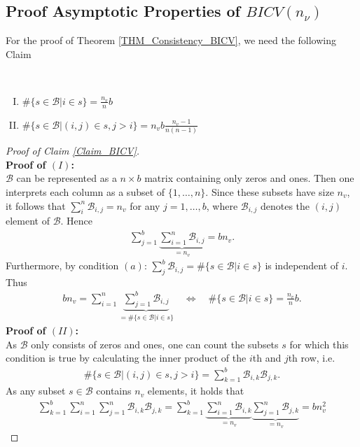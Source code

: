 \documentclass[Research_Module_ES.tex]{subfiles}
\begin{document}
\subsection{Proof Asymptotic Properties of $BICV(n_\nu)$}
For the proof of Theorem \ref{THM_Consistency_BICV}, we need the following Claim
\begin{claim}~
	\label{Claim_BICV}
	\begin{enumerate}[(I)]
		\item $\#\{s\in \mathcal{B}| i\in s\} = \frac{n_v}{n} b$ 
		\item $\#\{s\in\mathcal{B}|(i,j)\in s, j>i\}=n_vb\frac{n_v-1}{n(n-1)}$
	\end{enumerate}
\end{claim}
\begin{proof}[Proof of Claim \ref{Claim_BICV}]~\\
	\textbf{Proof of $(I)$:}\\
	$\mathcal{B}$ can be represented as a $n\times b$ matrix containing only zeros and ones. Then one interprets each column as a subset of $\{ 1,\dots,n\}$. Since these subsets have size $n_v$, it follows that $\sum_i^n \mathcal{B}_{i,j}=n_v$ for any $j= 1, \dots ,b$, where $\mathcal{B}_{i,j}$ denotes the $(i,j)$ element of $\mathcal{B}$. Hence
	\begin{align*}
	\sum_{j=1}^b\underbrace{\sum_{i=1}^n \mathcal{B}_{i,j}}_{=n_v} = bn_v.
	\end{align*}
	Furthermore, by condition $(a)$: $\sum_j^b \mathcal{B}_{i,j} = \#\{s\in \mathcal{B}| i\in s\}$ is independent of $i$. Thus 
	\begin{align*}
	bn_v = \sum_{i=1}^n\underbrace{\sum_{j=1}^b \mathcal{B}_{i,j}}_{=\#\{s\in \mathcal{B}| i\in s\}} \quad
	\iff \quad \#\{s\in \mathcal{B}| i\in s\} = \frac{n_v}{n}b. 
	\end{align*} 
	\textbf{Proof of $(II)$:}\\
	As $\mathcal{B}$ only consists of zeros and ones, one can count the subsets $s$ for which this condition is true by calculating the inner product of the $i$th and $j$th row, i.e.
	\begin{align*}
	\#\{s\in\mathcal{B}|(i,j)\in s, j>i\} = \sum_{k=1}^b\mathcal{B}_{i,k}\mathcal{B}_{j,k}.
	\end{align*}
	As any subset $s \in \mathcal{B}$ contains $n_v$ elements, it holds that
	\begin{align*}
	\sum_{k=1}^b\sum_{i=1}^n\sum_{j=1}^n\mathcal{B}_{i,k}\mathcal{B}_{j,k}= \sum_{k=1}^b\underbrace{\sum_{i=1}^n\mathcal{B}_{i,k}}_{=n_v}\underbrace{\sum_{j=1}^n\mathcal{B}_{j,k}}_{=n_v}=bn_v^2

\end{align*}
\end{proof}
\end{document}
